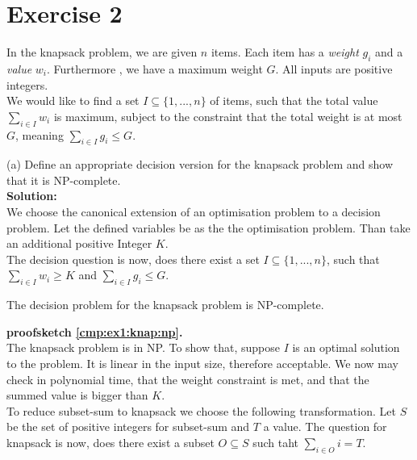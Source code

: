\section*{Exercise 2}

In the knapsack problem, we are given $n$ items. Each item has a \emph{weight} $g_i$ and a \emph{value} $w_i$.
Furthermore , we have a maximum weight $G$. All inputs are positive integers.\\

We would like to find a set $I \subseteq \{ 1,...,n \}$ of items, such that the total value
$\underset{i \in I}{\sum} w_i$ is maximum, subject to the constraint that the total weight is at most
$G$, meaning $\underset{i \in I}{\sum} g_i \leq G$.

\begin{description}

\item{(a)} Define an appropriate decision version for the knapsack problem and show that it is NP-complete.\\

\textbf{Solution:}\\

We choose the canonical extension of an optimisation problem to a decision problem. Let the defined variables
be as the the optimisation problem. Than take an additional positive Integer $K$.\\

The decision question is now, does there exist a set $I \subseteq \{ 1, ... , n \}$, such that
$\underset{i \in I}{\sum} w_i \geq K$ and $\underset{ i \in I}{\sum} g_i \leq G$.

\begin{lemma}\label{cmp:ex1:knap:np}
The decision problem for the knapsack problem is NP-complete.
\end{lemma}

\textbf{proofsketch \ref{cmp:ex1:knap:np}.}\\

The knapsack problem is in NP. To show that, suppose $I$ is an optimal solution to the problem. It is
linear in the input size, therefore acceptable. We now may check in polynomial time, that the weight
constraint is met, and that the summed value is bigger than $K$.\\

To reduce subset-sum to knapsack we choose the following transformation. Let $S$ be the set of
positive integers for subset-sum and $T$ a value. The question for knapsack is now, does there exist
a subset $O \subseteq S$ such taht $\underset{i \in O}{\sum} i = T$.\\


\end{description}
